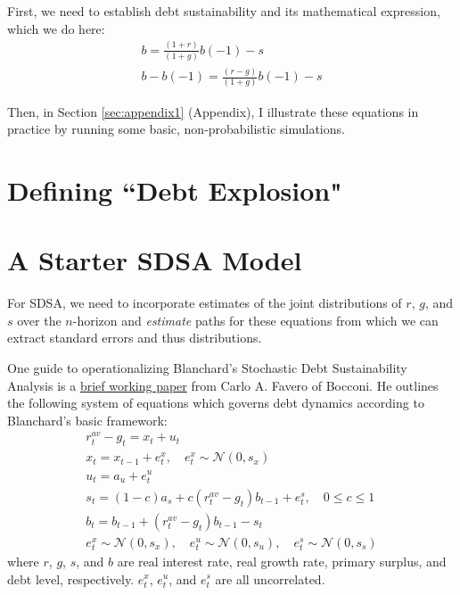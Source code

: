 \documentclass{article}
\begin{document}
First, we need to establish debt sustainability and its mathematical expression, which we do here:
\begin{gather}
	b = \frac{(1+r)}{(1+g)} b(-1) - s 
	\label{eq:b_basic}	\\
	b - b(-1) = \frac{(r-g)}{(1+g)} b(-1) - s
\end{gather}

Then, in Section \ref{sec:appendix1} (Appendix), I illustrate these equations in practice by running some basic, non-probabilistic simulations.

\section{Defining ``Debt Explosion"}


\section{A Starter SDSA Model}
For SDSA, we need to incorporate estimates of the joint distributions of $r$, $g$, and $s$ over the $n$-horizon and \textit{estimate} paths for these equations from which we can extract standard errors and thus distributions. 

One guide to operationalizing Blanchard's Stochastic Debt Sustainability Analysis is a \href{https://didattica.unibocconi.it/mypage/dwload.php?nomefile=Fiscal_Macro_2025_(3)20250403120402.pdf}{brief working paper} from Carlo A. Favero of Bocconi. He outlines the following system of equations which governs debt dynamics according to Blanchard's basic framework:
\begin{gather}
	r_t^{av} - g_t = x_t + u_t \\
	x_t = x_{t-1} + e_t^x,\quad e_t^x \sim \mathcal{N}(0, s_x) \\
	u_t = a_u + e_t^u \\
	s_t = (1 - c)a_s + c(r_t^{av} - g_t)b_{t-1} + e_t^s,\quad 0 \leq c \leq 1 \\
	b_t = b_{t-1} + (r_t^{av} - g_t) b_{t-1} - s_t \\
	e_t^x \sim \mathcal{N}(0, s_x),\quad e_t^u \sim \mathcal{N}(0, s_u),\quad e_t^s \sim \mathcal{N}(0, s_s)
\end{gather}
where $r$, $g$, $s$, and $b$ are real interest rate, real growth rate, primary surplus, and debt level, respectively. $e_t^x$, $e_t^u$, and $e_t^s$ are all uncorrelated. 
\end{document}
